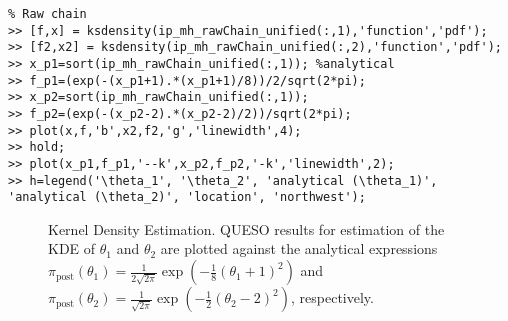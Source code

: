 \begin{lstlisting}[label=matlab:ip_kde,caption={Matlab code for the KDE plots displayed in the left of Figure \ref{fig:simple_sip_kde}.}]
% Inside Matlab
% Raw chain
>> [f,x] = ksdensity(ip_mh_rawChain_unified(:,1),'function','pdf');
>> [f2,x2] = ksdensity(ip_mh_rawChain_unified(:,2),'function','pdf');
>> x_p1=sort(ip_mh_rawChain_unified(:,1)); %analytical
>> f_p1=(exp(-(x_p1+1).*(x_p1+1)/8))/2/sqrt(2*pi);
>> x_p2=sort(ip_mh_rawChain_unified(:,1));
>> f_p2=(exp(-(x_p2-2).*(x_p2-2)/2))/sqrt(2*pi);
>> plot(x,f,'b',x2,f2,'g','linewidth',4);
>> hold;
>> plot(x_p1,f_p1,'--k',x_p2,f_p2,'-k','linewidth',2);
>> h=legend('\theta_1', '\theta_2', 'analytical (\theta_1)', 'analytical (\theta_2)', 'location', 'northwest');
\end{lstlisting}

% 

\begin{figure}[htpb]
\centering 
\vspace*{-10pt}
\caption{Kernel Density Estimation. QUESO results for estimation of the KDE of $\theta_1$ and $\theta_2$ are plotted against the analytical expressions $\pi_{\text{post}}(\theta_1)  =  \frac{1}{2\sqrt{2\pi}} \exp\left(-\frac{1}{8}(\theta_1+1)^2 \right)$  and $\pi_{\text{post}}(\theta_2)  =  \frac{1}{ \sqrt{2\pi}} \exp\left(-\frac{1}{2}(\theta_2-2)^2 \right)$, respectively.}
\label{fig:simple_sip_kde}
\end{figure}


